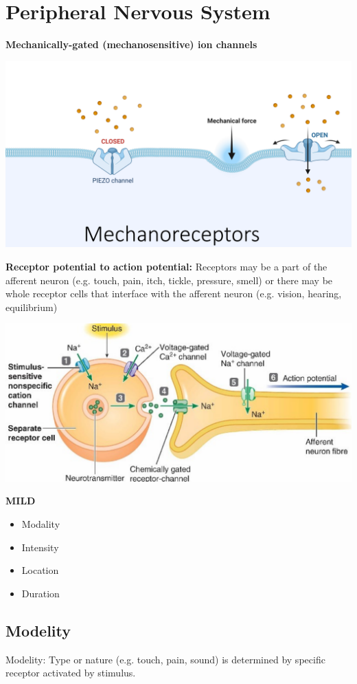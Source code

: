 \documentclass[11pt,fleqn]{book} %
\begin{document}
\section{Peripheral Nervous System}
\textbf{Mechanically-gated (mechanosensitive) ion channels}
\begin{center}
    \includegraphics[width=0.65\linewidth]{Pictures/Screenshot 2024-03-06 192802.png}
\end{center}
\textbf{Receptor potential to action potential:} Receptors may be a part of the afferent neuron (e.g. touch, pain, itch, tickle, pressure, smell) or there may be whole receptor cells that interface with the afferent neuron (e.g. vision, hearing, equilibrium)
\begin{center}
    \includegraphics[width=0.65\linewidth]{Pictures/Screenshot 2024-03-06 193004.png}
\end{center}
\textbf{MILD}
\begin{itemize}
    \item Modality
    \item Intensity
    \item Location
    \item Duration
\end{itemize}

\subsection{Modelity}
Modelity: Type or nature (e.g. touch, pain, sound) is determined by specific receptor activated by stimulus.
\end{document}
